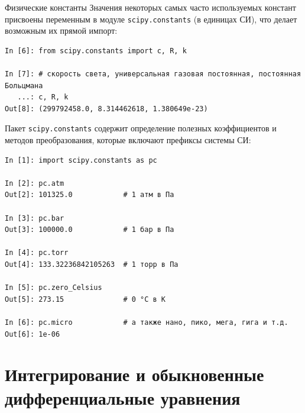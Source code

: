 \documentclass[aspectratio=169, mathserif]{beamer}	%
\begin{document}
\begin{frame}[fragile]{Физические константы}
\scriptsize
Значения некоторых самых часто используемых констант присвоены переменным в модуле \texttt{scipy.constants} (в единицах СИ), что делает возможным их прямой импорт:

\begin{lstlisting}[language=iPython, numbers=none, frame=none, ]
In [6]: from scipy.constants import c, R, k

In [7]: # скорость света, универсальная газовая постоянная, постоянная Больцмана
   ...: c, R, k
Out[8]: (299792458.0, 8.314462618, 1.380649e-23)
\end{lstlisting}

Пакет \texttt{scipy.constants} содержит определение полезных коэффициентов и методов преобразования, которые включают префиксы системы СИ:

\begin{lstlisting}[language=iPython, numbers=none, frame=none, ]
In [1]: import scipy.constants as pc

In [2]: pc.atm
Out[2]: 101325.0            # 1 атм в Па

In [3]: pc.bar
Out[3]: 100000.0            # 1 бар в Па

In [4]: pc.torr
Out[4]: 133.32236842105263  # 1 торр в Па

In [5]: pc.zero_Celsius
Out[5]: 273.15              # 0 °C в К

In [6]: pc.micro            # а также нано, пико, мега, гига и т.д.
Out[6]: 1e-06
\end{lstlisting}
\vfil
\end{frame}


\section{Интегрирование и обыкновенные \\ дифференциальные уравнения}
\sectionframe
\end{document}
